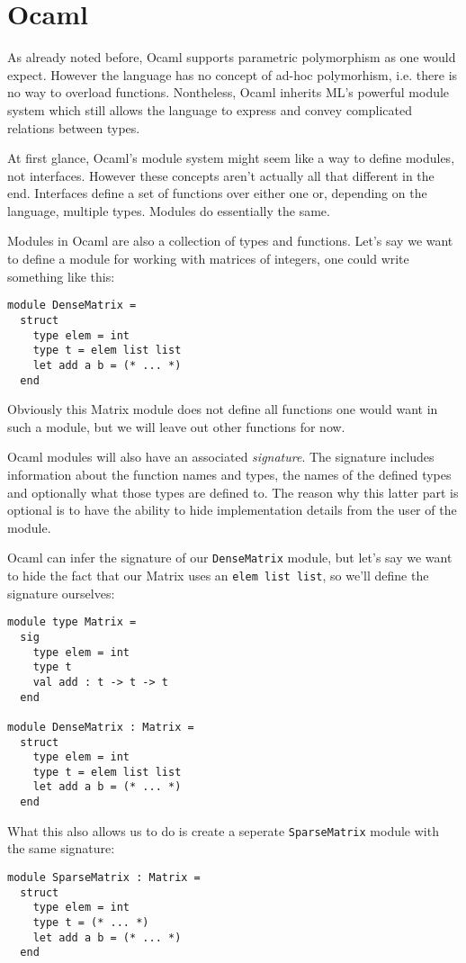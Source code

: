 \section{Ocaml}

As already noted before, Ocaml supports parametric polymorphism as one would expect. However the language has no concept of ad-hoc polymorhism, i.e. there is no way to overload functions. Nontheless, Ocaml inherits ML's powerful module system which still allows the language to express and convey complicated relations between types.

At first glance, Ocaml's module system might seem like a way to define modules, not interfaces. However these concepts aren't actually all that different in the end. Interfaces define a set of functions over either one or, depending on the language, multiple types. Modules do essentially the same.

Modules in Ocaml are also a collection of types and functions. Let's say we want to define a module for working with matrices of integers, one could write something like this:
\begin{verbatim}
module DenseMatrix =
  struct
    type elem = int
    type t = elem list list
    let add a b = (* ... *)
  end
\end{verbatim}
Obviously this Matrix module does not define all functions one would want in such a module, but we will leave out other functions for now.

Ocaml modules will also have an associated \textit{signature}. The signature includes information about the function names and types, the names of the defined types and optionally what those types are defined to. The reason why this latter part is optional is to have the ability to hide implementation details from the user of the module.

Ocaml can infer the signature of our \verb|DenseMatrix| module, but let's say we want to hide the fact that our Matrix uses an \verb|elem list list|, so we'll define the signature ourselves:
\begin{verbatim}
module type Matrix =
  sig
    type elem = int
    type t
    val add : t -> t -> t
  end

module DenseMatrix : Matrix =
  struct
    type elem = int
    type t = elem list list
    let add a b = (* ... *)
  end
\end{verbatim}
What this also allows us to do is create a seperate \verb|SparseMatrix| module with the same signature:
\begin{verbatim}
module SparseMatrix : Matrix =
  struct
    type elem = int
    type t = (* ... *)
    let add a b = (* ... *)
  end
\end{verbatim}


